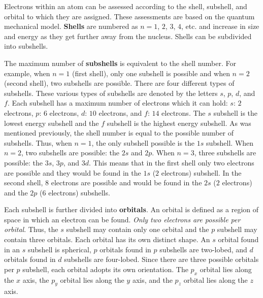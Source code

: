 \documentclass[a4paper,10pt]{article}
\begin{document}
{\noindent}Electrons within an atom can be assessed according to the shell, subshell, and orbital to which they are assigned. These assessments are based on the quantum mechanical model. \textbf{Shells} are numbered as $n=1$, $2$, $3$, $4$, etc. and increase in size and energy as they get further away from the nucleus. Shells can be subdivided into subshells.

{\noindent}The maximum number of \textbf{subshells} is equivalent to the shell number. For example, when $n=1$ (first shell), only one subshell is possible and when $n=2$ (second shell), two subshells are possible. There are four different types of subshells. These various types of subshells are denoted by the letters $s$, $p$, $d$, and $f$. Each subshell has a maximum number of electrons which it can hold: $s$: $2$ electrons, $p$: $6$ electrons, $d$: $10$ electrons, and $f$: $14$ electrons. The $s$ subshell is the lowest energy subshell and the $f$ subshell is the highest energy subshell. As was mentioned previously, the shell number is equal to the possible number of subshells. Thus, when $n=1$, the only subshell possible is the $1s$ subshell. When $n=2$, two subshells are possible: the $2s$ and $2p$. When $n=3$, three subshells are possible: the $3s$, $3p$, and $3d$. This means that in the first shell only two electrons are possible and they would be found in the $1s$ ($2$ electrons) subshell. In the second shell, $8$ electrons are possible and would be found in the $2s$ ($2$ electrons) and the $2p$ ($6$ electrons) subshells.

{\noindent}Each subshell is further divided into \textbf{orbitals}. An orbital is defined as a region of space in which an electron can be found. \textit{Only two electrons are possible per orbital}. Thus, the $s$ subshell may contain only one orbital and the $p$ subshell may contain three orbitals. Each orbital has its own distinct shape. An $s$ orbital found in an $s$ subshell is spherical, $p$ orbitals found in $p$ subshells are two-lobed, and $d$ orbitals found in $d$ subshells are four-lobed. Since there are three possible orbitals per $p$ subshell, each orbital adopts its own orientation. The $p_x$ orbital lies along the $x$ axis, the $p_y$ orbital lies along the $y$ axis, and the $p_z$ orbital lies along the $z$ axis.
\end{document}

